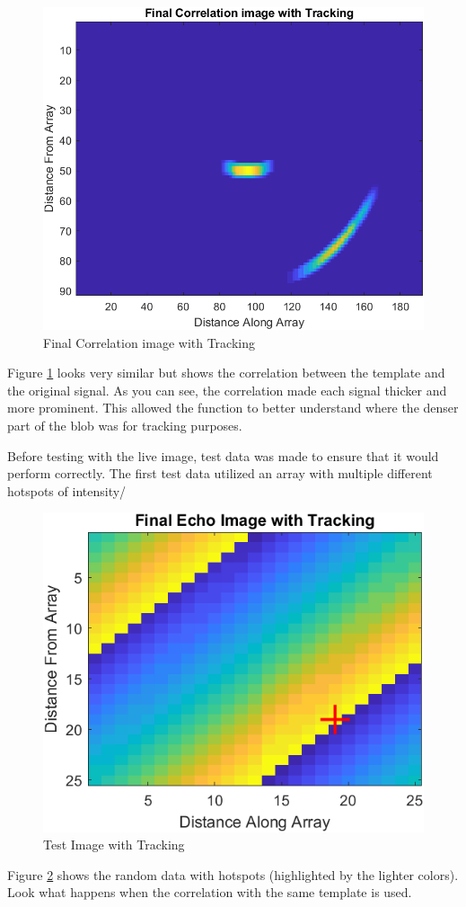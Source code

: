 \begin{figure}[H]
    \centering
    \includegraphics[width=0.5\linewidth]{figures/TrackingImage1.png}
    \caption{Final Correlation image with Tracking}
    \label{fig:TrackingImage1}
\end{figure}

Figure \ref{fig:TrackingImage1} looks very similar but shows the correlation between the template and the original signal. As you can see, the correlation made each signal thicker and more prominent. This allowed the function to better understand where the denser part of the blob was for tracking purposes.

Before testing with the live image, test data was made to ensure that it would perform correctly. The first test data utilized an array with multiple different hotspots of intensity/

\begin{figure}[H]
    \centering
    \includegraphics[width=0.5\linewidth]{figures/TrackingImage3.png}
    \caption{Test Image with Tracking}
    \label{fig:TrackingImage3}
\end{figure}

Figure \ref{fig:TrackingImage3} shows the random data with hotspots (highlighted by the lighter colors). Look what happens when the correlation with the same template is used.

